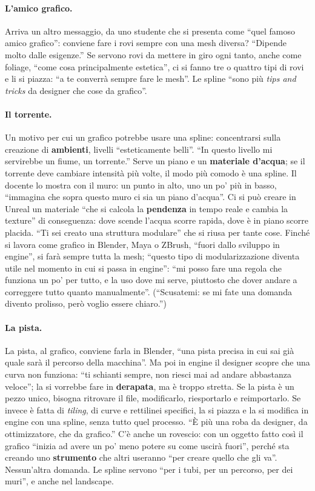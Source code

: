 \paragraph{L'amico grafico.} Arriva un altro messaggio, da uno studente che si presenta come
``quel famoso amico grafico'': conviene fare i rovi sempre con una mesh diversa? ``Dipende molto
dalle esigenze.'' Se servono rovi da mettere in giro ogni tanto, anche come foliage, ``come cosa
principalmente estetica'', ci si fanno tre o quattro tipi di rovi e li si piazza: ``a te converrà
sempre fare le mesh''. Le spline ``sono più \emph{tips and tricks} da designer che cose da
grafico''.

\paragraph{Il torrente.} Un motivo per cui un grafico potrebbe usare una spline: concentrarsi
sulla creazione di \textbf{ambienti}, livelli ``esteticamente belli''. ``In questo livello mi
servirebbe un fiume, un torrente.'' Serve un piano e un \textbf{materiale d'acqua}; se il
torrente deve cambiare intensità più volte, il modo più comodo è una spline. Il docente lo mostra
con il muro: un punto in alto, uno un po' più in basso, ``immagina che sopra questo muro ci sia un
piano d'acqua''. Ci si può creare in Unreal un materiale ``che si calcola la \textbf{pendenza} in
tempo reale e cambia la texture'' di conseguenza: dove scende l'acqua scorre rapida, dove è in
piano scorre placida. ``Ti sei creato una struttura modulare'' che si riusa per tante cose.
Finché si lavora come grafico in Blender, Maya o ZBrush, ``fuori dallo sviluppo in engine'', si
farà sempre tutta la mesh; ``questo tipo di modularizzazione diventa utile nel momento in cui si
passa in engine'': ``mi posso fare una regola che funziona un po' per tutto, e la uso dove mi
serve, piuttosto che dover andare a correggere tutto quanto manualmente''. (``Scusatemi: se mi
fate una domanda divento prolisso, però voglio essere chiaro.'')

\paragraph{La pista.} La pista, al grafico, conviene farla in Blender, ``una pista precisa in
cui sai già quale sarà il percorso della macchina''. Ma poi in engine il designer scopre che una
curva non funziona: ``ti schianti sempre, non riesci mai ad andare abbastanza veloce''; la si
vorrebbe fare in \textbf{derapata}, ma è troppo stretta. Se la pista è un pezzo unico, bisogna
ritrovare il file, modificarlo, riesportarlo e reimportarlo. Se invece è fatta di \emph{tiling},
di curve e rettilinei specifici, la si piazza e la si modifica in engine con una spline, senza
tutto quel processo. ``È più una roba da designer, da ottimizzatore, che da grafico.'' C'è anche
un rovescio: con un oggetto fatto così il grafico ``inizia ad avere un po' meno potere su come
uscirà fuori'', perché sta creando uno \textbf{strumento} che altri useranno ``per creare quello
che gli va''. Nessun'altra domanda. Le spline servono ``per i tubi, per un percorso, per dei
muri'', e anche nel landscape.

